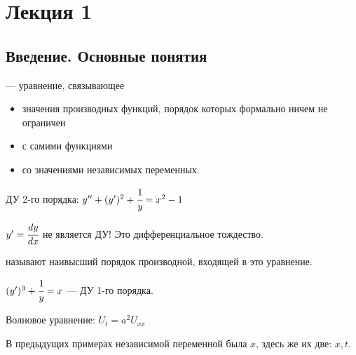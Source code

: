 
    \section{\Large{Лекция 1}}
    \subsection{\large{ Введение. Основные понятия}}
\begin{Def}
 --- уравнение, связывающее \begin{itemize}
    \item значения производных функций, порядок которых формально ничем не ограничен
    \item с самими функциями
    \item со значениями независимых переменных.
\end{itemize}
\end{Def}

\vspace{3mm}

\begin{example}
ДУ 2-го порядка:
$y'' + (y')^2 + \cfrac{1}{y} = x^2 - 1$
\end{example}

 $y' = \cfrac{dy}{dx}$ не является ДУ! Это дифференциальное тождество.

\vspace{5mm}
\begin{Def}
 называют наивысший порядок производной, входящей в это уравнение.
\end{Def}

\vspace{3mm}

\begin{example}
$(y')^3 + \cfrac{1}{y} = x$ --- ДУ 1-го порядка.
\end{example}

\begin{example}
Волновое уравнение: $U_t = a^2 U_{xx}$
\end{example}

В предыдущих примерах независимой переменной была $x$, здесь же их две: $x, t$.

\vspace{5mm}

